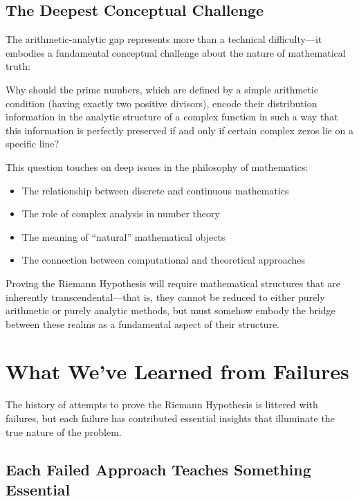 \subsection{The Deepest Conceptual Challenge}
\label{subsec:deepest_challenge}

The arithmetic-analytic gap represents more than a technical difficulty—it embodies a fundamental conceptual challenge about the nature of mathematical truth:

\begin{question}
Why should the prime numbers, which are defined by a simple arithmetic condition (having exactly two positive divisors), encode their distribution information in the analytic structure of a complex function in such a way that this information is perfectly preserved if and only if certain complex zeros lie on a specific line?
\end{question}

This question touches on deep issues in the philosophy of mathematics:
\begin{itemize}
\item The relationship between discrete and continuous mathematics
\item The role of complex analysis in number theory  
\item The meaning of ``natural'' mathematical objects
\item The connection between computational and theoretical approaches
\end{itemize}

\begin{conjecture}
Proving the Riemann Hypothesis will require mathematical structures that are inherently transcendental—that is, they cannot be reduced to either purely arithmetic or purely analytic methods, but must somehow embody the bridge between these realms as a fundamental aspect of their structure.
\end{conjecture}

\section{What We've Learned from Failures}
\label{sec:learning_from_failures}

The history of attempts to prove the Riemann Hypothesis is littered with failures, but each failure has contributed essential insights that illuminate the true nature of the problem.

\subsection{Each Failed Approach Teaches Something Essential}
\label{subsec:essential_lessons}

